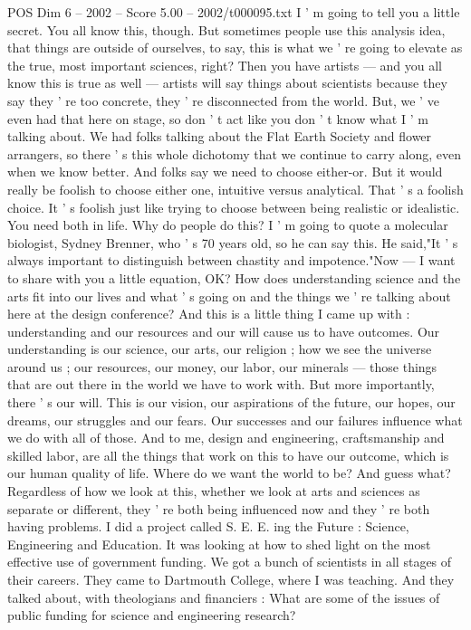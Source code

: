\begin{textsample}{POS Dim 6 – 2002 – Score 5.00 – 2002/t000095.txt}
I ' m going to tell you a little secret.
You all know this, though.
But sometimes people use this analysis idea, that things are outside of ourselves, to say, this is what we ' re going to elevate as the true, most important sciences, right?
Then you have artists — and you all know this is true as well — artists will say things about scientists because they say they ' re too concrete, they ' re disconnected from the world.
But, we ' ve even had that here on stage, so don ' t act like you don ' t know what I ' m talking about.
We had folks talking about the Flat Earth Society and flower arrangers, so there ' s this whole dichotomy that we continue to carry along, even when we know better.
And folks say we need to choose either-or.
But it would really be foolish to choose either one, intuitive versus analytical.
That ' s a foolish choice.
It ' s foolish just like trying to choose between being realistic or idealistic.
You need both in life.
Why do people do this?
I ' m going to quote a molecular biologist, Sydney Brenner, who ' s 70 years old, so he can say this.
He said,"It ' s always important to distinguish between chastity and impotence."Now — I want to share with you a little equation, OK?
How does understanding science and the arts fit into our lives and what ' s going on and the things we ' re talking about here at the design conference?
And this is a little thing I came up with : understanding and our resources and our will cause us to have outcomes.
Our understanding is our science, our arts, our religion ; how we see the universe around us ; our resources, our money, our labor, our minerals — those things that are out there in the world we have to work with.
But more importantly, there ' s our will.
This is our vision, our aspirations of the future, our hopes, our dreams, our struggles and our fears.
Our successes and our failures influence what we do with all of those.
And to me, design and engineering, craftsmanship and skilled labor, are all the things that work on this to have our outcome, which is our human quality of life.
Where do we want the world to be?
And guess what?
Regardless of how we look at this, whether we look at arts and sciences as separate or different, they ' re both being influenced now and they ' re both having problems.
I did a project called S.
E.
E. ing the Future : Science, Engineering and Education.
It was looking at how to shed light on the most effective use of government funding.
We got a bunch of scientists in all stages of their careers.
They came to Dartmouth College, where I was teaching.
And they talked about, with theologians and financiers : What are some of the issues of public funding for science and engineering research?

\end{textsample}
